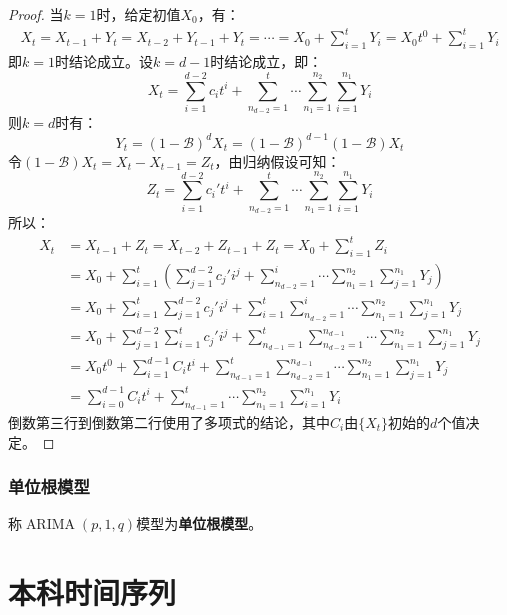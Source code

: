\begin{proof}
	当$k=1$时，给定初值$X_0$，有：
	\begin{align*}
		X_t=X_{t-1}+Y_t=X_{t-2}+Y_{t-1}+Y_t=\cdots=X_0+\sum_{i=1}^{t}Y_i=X_0t^0+\sum_{i=1}^{t}Y_i
	\end{align*}
	即$k=1$时结论成立。设$k=d-1$时结论成立，即：
	\begin{equation*}
		X_t=\sum_{i=1}^{d-2}c_it^{i}+\sum_{n_{d-2}=1}^{t}\cdots\sum_{n_1=1}^{n_2}\sum_{i=1}^{n_1}Y_i
	\end{equation*}
	则$k=d$时有：
	\begin{equation*}
		Y_t=(1-\mathcal{B})^dX_t=(1-\mathcal{B})^{d-1}(1-\mathcal{B})X_t
	\end{equation*}
	令$(1-\mathcal{B})X_t=X_t-X_{t-1}=Z_t$，由归纳假设可知：
	\begin{equation*}
		Z_t=\sum_{i=1}^{d-2}c_i't^{i}+\sum_{n_{d-2}=1}^{t}\cdots\sum_{n_1=1}^{n_2}\sum_{i=1}^{n_1}Y_i
	\end{equation*}
	所以：
	\begin{align*}
		X_t&=X_{t-1}+Z_t=X_{t-2}+Z_{t-1}+Z_t=X_0+\sum_{i=1}^{t}Z_i \\
		&=X_0+\sum_{i=1}^{t}\left(\sum_{j=1}^{d-2}c_j'i^{j}+\sum_{n_{d-2}=1}^{i}\cdots\sum_{n_1=1}^{n_2}\sum_{j=1}^{n_1}Y_j\right) \\
		&=X_0+\sum_{i=1}^{t}\sum_{j=1}^{d-2}c_j'i^{j}+\sum_{i=1}^{t}\sum_{n_{d-2}=1}^{i}\cdots\sum_{n_1=1}^{n_2}\sum_{j=1}^{n_1}Y_j \\
		&=X_0+\sum_{j=1}^{d-2}\sum_{i=1}^{t}c_j'i^{j}+\sum_{n_{d-1}=1}^{t}\sum_{n_{d-2}=1}^{n_{d-1}}\cdots\sum_{n_1=1}^{n_2}\sum_{j=1}^{n_1}Y_j \\
		&=X_0t^0+\sum_{i=1}^{d-1}C_it^i+\sum_{n_{d-1}=1}^{t}\sum_{n_{d-2}=1}^{n_{d-1}}\cdots\sum_{n_1=1}^{n_2}\sum_{j=1}^{n_1}Y_j \\
		&=\sum_{i=0}^{d-1}C_it^{i}+\sum_{n_{d-1}=1}^{t}\cdots\sum_{n_1=1}^{n_2}\sum_{i=1}^{n_1}Y_i
	\end{align*}
	倒数第三行到倒数第二行使用了多项式的结论，其中$C_i$由$\{X_t\}$初始的$d$个值决定。
\end{proof}
\subsubsection{单位根模型}
\begin{definition}
	称$\operatorname{ARIMA}(p,1,q)$模型为\textbf{单位根模型}。
\end{definition}



\section{本科时间序列}


